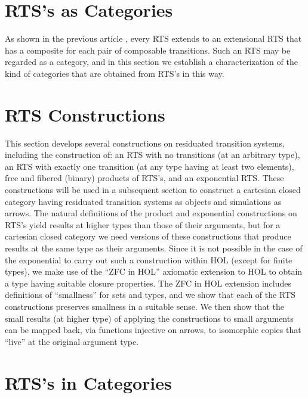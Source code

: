 \documentclass[11pt,notitlepage,a4paper]{report}
\begin{document}
\chapter{RTS's as Categories}
\label{rts_as_categories_chapter}

As shown in the previous article \cite{ResiduatedTransitionSystem-AFP},
every RTS extends to an extensional RTS that has a composite for each pair of composable
transitions.  Such an RTS may be regarded as a category, and in this section
we establish a characterization of the kind of categories that are obtained
from RTS's in this way.

  
  

\chapter{RTS Constructions}
\label{rts_constructions_chapter}

This section develops several constructions on residuated transition systems,
including the construction of: an RTS with no transitions (at an arbitrary type),
an RTS with exactly one transition (at any type having at least two elements),
free and fibered (binary) products of RTS's, and an exponential RTS.
These constructions will be used in a subsequent section to construct a cartesian closed
category having residuated transition systems as objects and simulations as arrows.
The natural definitions of the product and exponential constructions on RTS's yield results
at higher types than those of their arguments, but for a cartesian closed category we need
versions of these constructions that produce results at the same type as their arguments.
Since it is not possible in the case of the exponential to carry out such a construction
within HOL (except for finite types), we make use of the ``ZFC in HOL'' axiomatic extension
to HOL to obtain a type having suitable closure properties.  The ZFC in HOL extension
includes definitions of ``smallness'' for sets and types, and we show that each of the
RTS constructions preserves smallness in a suitable sense.  We then show that the small
results (at higher type) of applying the constructions to small arguments can be mapped back,
via functions injective on arrows, to isomorphic copies that ``live'' at the original
argument type.

  

\chapter{RTS's in Categories}
\label{rts_in_categories_chapter}
\end{document}
